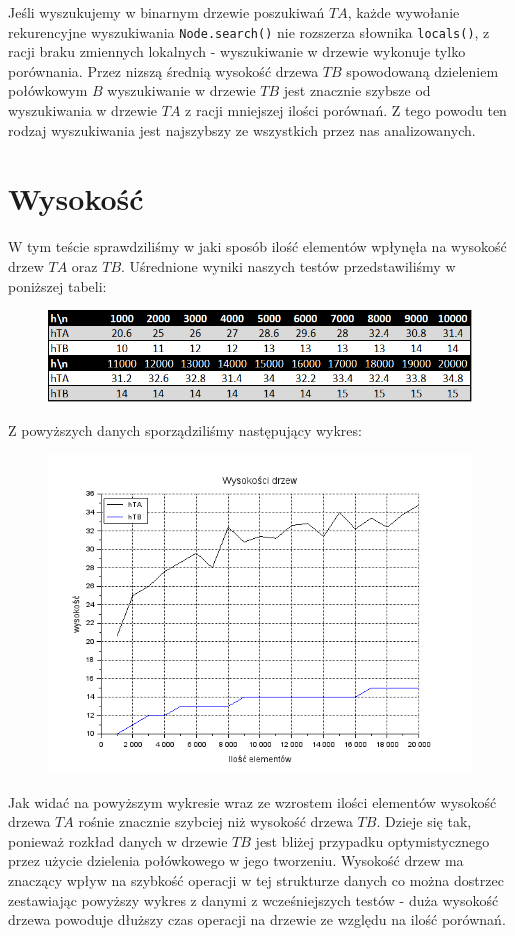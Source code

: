 \documentclass{article}
\begin{document}
Jeśli wyszukujemy w binarnym drzewie poszukiwań $TA$, każde wywołanie rekurencyjne wyszukiwania \verb+Node.search()+ nie rozszerza słownika \verb+locals()+, z racji braku zmiennych lokalnych - wyszukiwanie w drzewie wykonuje tylko porównania. Przez nizszą średnią wysokość drzewa $TB$ spowodowaną dzieleniem połówkowym $B$ wyszukiwanie w drzewie $TB$ jest znacznie szybsze od wyszukiwania w drzewie $TA$ z racji mniejszej ilości porównań. Z tego powodu ten rodzaj wyszukiwania jest najszybszy ze wszystkich przez nas analizowanych.

\section{Wysokość}

W tym teście sprawdziliśmy w jaki sposób ilość elementów wpłynęła na wysokość drzew $TA$ oraz $TB$. Uśrednione wyniki naszych testów przedstawiliśmy w poniższej tabeli:

\begin{figure}[h]
\centering
  \includegraphics[width=0.9\linewidth]{wysokosc_tabela}
  \label{fig:wysokosc_tabela}
\end{figure}%

Z powyższych danych sporządziliśmy następujący wykres:

\begin{figure}[h]
\centering
  \includegraphics[width=0.5\linewidth]{wysokosc}
  \label{fig:wysokosc}
\end{figure}%
\pagebreak

Jak widać na powyższym wykresie wraz ze wzrostem ilości elementów wysokość drzewa $TA$ rośnie znacznie szybciej niż wysokość drzewa $TB$. Dzieje się tak, ponieważ rozkład danych w drzewie $TB$ jest bliżej przypadku optymistycznego przez użycie dzielenia połówkowego w jego tworzeniu. Wysokość drzew ma znaczący wpływ na szybkość operacji w tej strukturze danych co można dostrzec zestawiając powyższy wykres z danymi z wcześniejszych testów - duża wysokość drzewa powoduje dłuższy czas operacji na drzewie ze względu na ilość porównań.
\end{document}
